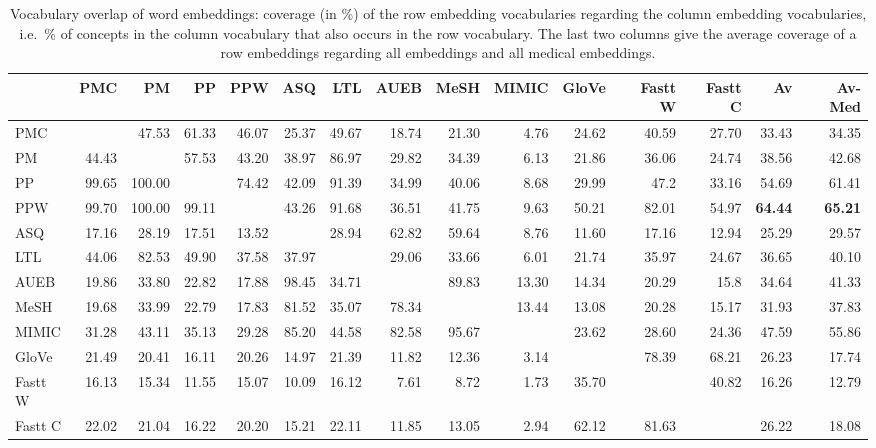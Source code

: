 \documentclass[letterpaper]{article} %
\begin{document}
\begin{sidewaystable}[h]
    \centering
    \small
    \begin{tabular}{l | r r r r r r r r r r r r | r r}
    & PMC & PM & PP & PPW & ASQ & LTL & AUEB & MeSH & MIMIC & GloVe & Fastt W & Fastt C & Av & Av-Med \\ \midrule
PMC  & & 47.53 & 61.33 & 46.07 & 25.37 & 49.67 & 18.74 & 21.30 & 4.76 & 24.62 & 40.59 & 27.70 & 33.43 & 34.35\\
PM & 44.43 &  & 57.53 & 43.20 & 38.97 & 86.97 & 29.82 & 34.39 & 6.13 & 21.86 & 36.06 & 24.74 & 38.56 & 42.68\\
PP & 99.65 & 100.00 & & 74.42 & 42.09 & 91.39 & 34.99 & 40.06 & 8.68 & 29.99 & 47.2 & 33.16 & 54.69 & 61.41\\
PPW & 99.70 & 100.00 & 99.11 &  & 43.26 & 91.68 & 36.51 & 41.75 & 9.63 & 50.21 & 82.01 & 54.97 & \textbf{64.44} & \textbf{65.21}\\
ASQ & 17.16 & 28.19 & 17.51 & 13.52 &  & 28.94 & 62.82 & 59.64 & 8.76 & 11.60 & 17.16 & 12.94 & 25.29 & 29.57 \\
LTL & 44.06 & 82.53 & 49.90 & 37.58 & 37.97 & & 29.06 & 33.66 & 6.01 & 21.74 & 35.97 & 24.67 & 36.65 & 40.10\\
AUEB & 19.86 & 33.80 & 22.82 & 17.88 & 98.45 & 34.71 &  & 89.83 & 13.30 & 14.34 & 20.29 & 15.8 & 34.64 & 41.33 \\
MeSH & 19.68 & 33.99 & 22.79 & 17.83 & 81.52 & 35.07 & 78.34 &  & 13.44 & 13.08 & 20.28 & 15.17 & 31.93 & 37.83\\
MIMIC & 31.28 & 43.11 & 35.13 & 29.28 & 85.20 & 44.58 & 82.58 & 95.67 &  & 23.62 & 28.60 & 24.36 & 47.59 & 55.86\\
GloVe & 21.49 & 20.41 & 16.11 & 20.26 & 14.97 & 21.39 & 11.82 & 12.36 & 3.14 &  & 78.39 & 68.21 & 26.23 & 17.74\\
Fastt W & 16.13 & 15.34 & 11.55 & 15.07 & 10.09 & 16.12 & 7.61 & 8.72 & 1.73 & 35.70 &  & 40.82 & 16.26 & 12.79\\
Fastt C & 22.02 & 21.04 & 16.22 & 20.20 & 15.21 & 22.11 & 11.85 & 13.05 & 2.94 & 62.12 & 81.63 & &  26.22 & 18.08\\
    \end{tabular}
    \caption{Vocabulary overlap of word embeddings: coverage (in \%) of the row embedding vocabularies regarding the column embedding vocabularies, i.e.~\% of concepts in the column vocabulary that also occurs in the row vocabulary. The last two columns give the average coverage of a row embeddings regarding all embeddings and all medical embeddings.}
    \label{tab:embedding_coverage}
\end{sidewaystable}
\end{document}

